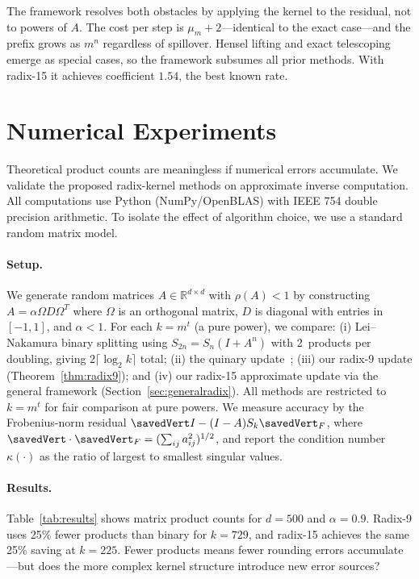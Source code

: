 \documentclass[
  journal=largetwo,
  manuscript=article,
  manuscriptlabel={Research Preprint},
  logo=false,
  simfonts=false,
  year=2026,
  volume=1,
]{cup-journal}
\let\|\savedVert
\theoremstyle{definition}
\theoremstyle{remark}
\begin{document}
The framework resolves both obstacles by applying the kernel to the
residual, not to powers of $A$.
The cost per step is $\mu_m + 2$---identical to the exact case---and
the prefix grows as $m^n$ regardless of spillover.
Hensel lifting and exact telescoping emerge as special cases, so the
framework subsumes all prior methods.
With radix-15 it achieves coefficient $1.54$, the best known rate.


\section{Numerical Experiments}
\label{sec:numerics}

Theoretical product counts are meaningless if numerical errors accumulate.
We validate the proposed radix-kernel methods on approximate inverse computation.
All computations use Python (NumPy/OpenBLAS) with IEEE 754 double precision arithmetic.
To isolate the effect of algorithm choice, we use a standard random matrix model.

\paragraph{Setup.}
We generate random matrices $A \in \mathbb{R}^{d \times d}$ with $\rho(A) < 1$ by
constructing $A = \alpha \Omega D \Omega^T$ where $\Omega$ is an orthogonal matrix, $D$ is diagonal with
entries in $[-1, 1]$, and $\alpha < 1$. For each $k = m^t$ (a pure power), we
compare: (i) Lei--Nakamura binary splitting using $S_{2n} = S_n(I + A^n)$ with
2~products per doubling, giving $2\lceil\log_2 k\rceil$ total; (ii) the quinary update~\cite{gustafsson2017};
(iii) our radix-9 update (Theorem~\ref{thm:radix9}); and (iv) our radix-15 approximate update
via the general framework (Section~\ref{sec:generalradix}).
All methods are restricted to $k = m^t$ for fair comparison at pure powers.
We measure accuracy by the Frobenius-norm residual $\|I - (I-A)S_k\|_F$, where $\|\cdot\|_F = (\sum_{ij} a_{ij}^2)^{1/2}$, and report the condition number $\kappa(\cdot)$ as the ratio of largest to smallest singular values.

\paragraph{Results.}
Table~\ref{tab:results} shows matrix product counts for $d = 500$ and $\alpha = 0.9$.
Radix-9 uses 25\% fewer products than binary for $k = 729$,
and radix-15 achieves the same 25\% saving at $k = 225$.
Fewer products means fewer rounding errors accumulate---but does the more complex
kernel structure introduce new error sources?
\end{document}
